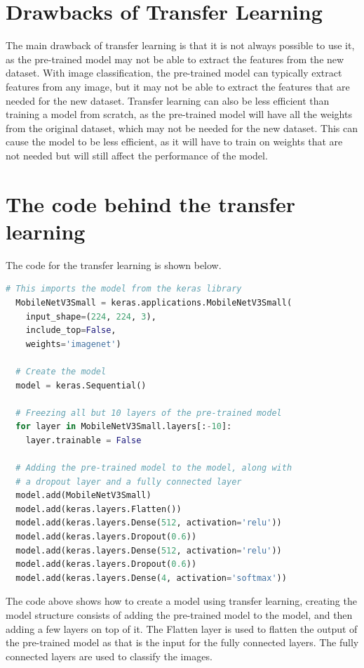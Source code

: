 \documentclass[]{final_report}
\begin{document}
\section{Drawbacks of Transfer Learning}
The main drawback of transfer learning is that it is not always possible to use it,
as the pre-trained model may not be able to extract the features from the new dataset.
With image classification, the pre-trained model can typically extract features from any image, but it may not be able to extract the features that are needed for the new dataset.
Transfer learning can also be less efficient than training a model from scratch,
as the pre-trained model will have all the weights from the original dataset, which may not be needed for the new dataset.
This can cause the model to be less efficient, as it will have to train on weights that are not
needed but will still affect the performance of the model.

\pagebreak
\section{The code behind the transfer learning}
The code for the transfer learning is shown below.

\begin{lstlisting}[language=Python]
  # This imports the model from the keras library
  MobileNetV3Small = keras.applications.MobileNetV3Small(
    input_shape=(224, 224, 3),
    include_top=False, 
    weights='imagenet')

  # Create the model
  model = keras.Sequential()

  # Freezing all but 10 layers of the pre-trained model
  for layer in MobileNetV3Small.layers[:-10]:
    layer.trainable = False

  # Adding the pre-trained model to the model, along with 
  # a dropout layer and a fully connected layer
  model.add(MobileNetV3Small)
  model.add(keras.layers.Flatten())
  model.add(keras.layers.Dense(512, activation='relu'))
  model.add(keras.layers.Dropout(0.6))
  model.add(keras.layers.Dense(512, activation='relu'))
  model.add(keras.layers.Dropout(0.6))
  model.add(keras.layers.Dense(4, activation='softmax'))
\end{lstlisting}

The code above shows how to create a model using transfer learning,
creating the model structure consists of adding the pre-trained model to the model,
and then adding a few layers on top of it. The Flatten layer is used to flatten the output of the pre-trained model
as that is the input for the fully connected layers. The fully connected layers are used to classify the images.
\end{document}
